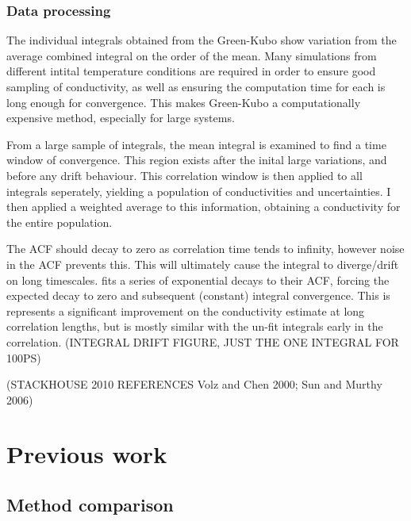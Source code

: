 \subsubsection{Data processing}

The individual integrals obtained from the Green-Kubo show variation from the average combined integral on the order of the mean. Many simulations from different intital temperature conditions are required in order to ensure good sampling of conductivity, as well as ensuring the computation time for each is long enough for convergence. This makes Green-Kubo a computationally expensive method, especially for large systems.

From a large sample of integrals, the mean integral is examined to find a time window of convergence. This region exists after the inital large variations, and before any drift behaviour. This correlation window is then applied to all integrals seperately, yielding a population of conductivities and uncertainties. I then applied a weighted average to this information, obtaining a conductivity for the entire population.

The ACF should decay to zero as correlation time tends to infinity, however noise in the ACF prevents this. This will ultimately cause the integral to diverge/drift on long timescales. \citet{Howell2012} fits a series of exponential decays to their ACF, forcing the expected decay to zero and subsequent (constant) integral convergence. This is represents a significant improvement on the conductivity estimate at long correlation lengths, but is mostly similar with the un-fit integrals early in the correlation. (INTEGRAL DRIFT FIGURE, JUST THE ONE INTEGRAL FOR 100PS)

(STACKHOUSE 2010 REFERENCES Volz and Chen 2000; Sun and Murthy 2006)







\section{Previous work}

\subsection{Method comparison}

